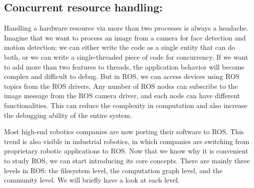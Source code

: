 \documentclass[../../main]{subfiles}
\begin{document}
\subsection{Concurrent resource handling:} Handling a hardware resource via more than two
processes is always a headache. Imagine that we want to process an image from a
camera for face detection and motion detection; we can either write the code as a
single entity that can do both, or we can write a single-threaded piece of code for
concurrency. If we want to add more than two features to threads, the application
behavior will become complex and difficult to debug. But in ROS, we can access
devices using ROS topics from the ROS drivers. Any number of ROS nodes can
subscribe to the image message from the ROS camera driver, and each node can
have different functionalities. This can reduce the complexity in computation and
also increase the debugging ability of the entire system.


Most high-end robotics companies are now porting their software to ROS.
This trend is also visible in industrial robotics, in which companies are switching from
proprietary robotic applications to ROS.
Now that we know why it is convenient to study ROS, we can start introducing its core
concepts. There are mainly three levels in ROS: the filesystem level, the computation graph
level, and the community level. We will briefly have a look at each level.
\end{document}
